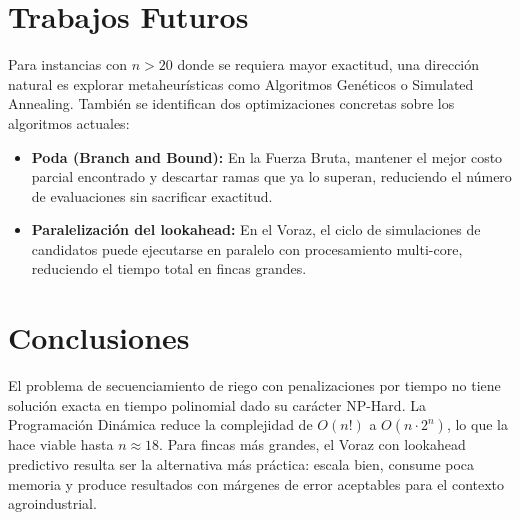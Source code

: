 \documentclass[conference, a4paper]{IEEEtran}
\begin{document}
\section{Trabajos Futuros}
Para instancias con $n > 20$ donde se requiera mayor exactitud, una dirección natural es explorar metaheurísticas como Algoritmos Genéticos o Simulated Annealing. También se identifican dos optimizaciones concretas sobre los algoritmos actuales:
\begin{itemize}
    \item \textbf{Poda (Branch and Bound):} En la Fuerza Bruta, mantener el mejor costo parcial encontrado y descartar ramas que ya lo superan, reduciendo el número de evaluaciones sin sacrificar exactitud.
    \item \textbf{Paralelización del lookahead:} En el Voraz, el ciclo de simulaciones de candidatos puede ejecutarse en paralelo con procesamiento multi-core, reduciendo el tiempo total en fincas grandes.
\end{itemize}

\section{Conclusiones}
El problema de secuenciamiento de riego con penalizaciones por tiempo no tiene solución exacta en tiempo polinomial dado su carácter NP-Hard. La Programación Dinámica reduce la complejidad de $O(n!)$ a $O(n \cdot 2^n)$, lo que la hace viable hasta $n \approx 18$. Para fincas más grandes, el Voraz con lookahead predictivo resulta ser la alternativa más práctica: escala bien, consume poca memoria y produce resultados con márgenes de error aceptables para el contexto agroindustrial.
\end{document}
